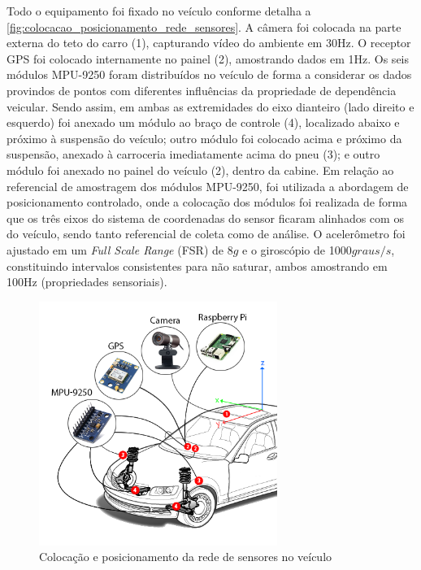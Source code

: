 Todo o equipamento foi fixado no veículo conforme detalha a \autoref{fig:colocacao_posicionamento_rede_sensores}. A câmera foi colocada na parte externa do teto do carro (1), capturando vídeo do ambiente em 30Hz. O receptor GPS foi colocado internamente no painel (2), amostrando dados em 1Hz. Os seis módulos MPU-9250 foram distribuídos no veículo de forma a considerar os dados provindos de pontos com diferentes influências da propriedade de dependência veicular. Sendo assim, em ambas as extremidades do eixo dianteiro (lado direito e esquerdo) foi anexado um módulo ao braço de controle (4), localizado abaixo e próximo à suspensão do veículo; outro módulo foi colocado acima e próximo da suspensão, anexado à carroceria imediatamente acima do pneu (3); e outro módulo foi anexado no painel do veículo (2), dentro da cabine. Em relação ao referencial de amostragem dos módulos MPU-9250, foi utilizada a abordagem de posicionamento controlado, onde a colocação dos módulos foi realizada de forma que os três eixos do sistema de coordenadas do sensor ficaram alinhados com os do veículo, sendo tanto referencial de coleta como de análise. O acelerômetro foi ajustado em um \textit{Full Scale Range} (FSR) de 8$g$ e o giroscópio de 1000$graus/s$, constituindo intervalos consistentes para não saturar, ambos amostrando em 100Hz (propriedades sensoriais).

\begin{figure}[h!]
  \centering
  \caption{Colocação e posicionamento da rede de sensores no veículo}
   \label{fig:colocacao_posicionamento_rede_sensores}
   \includegraphics[width=0.69\textwidth]{figuras/fig_22.png}
\end{figure}


